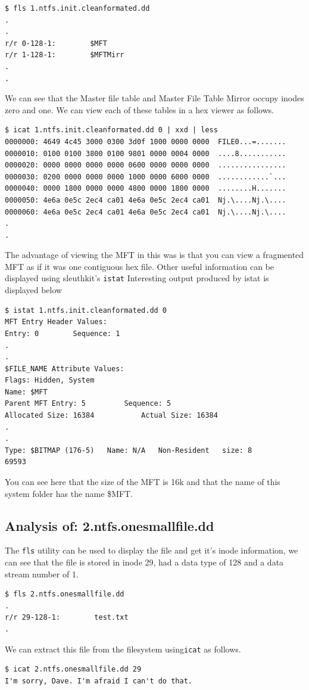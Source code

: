 \documentclass[a4paper,
    11pt,
    normalheadings,
    parindent,
    UKenglish,
    abstracton,
    ]{scrartcl}
\begin{document}
\begin{verbatim}
$ fls 1.ntfs.init.cleanformated.dd
.
.
r/r 0-128-1:        $MFT
r/r 1-128-1:        $MFTMirr
.
.
\end{verbatim}
We can see that the Master file table and Master File Table Mirror occupy inodes zero and one. We can view each of these tables in a hex viewer as follows.
\begin{verbatim}
$ icat 1.ntfs.init.cleanformated.dd 0 | xxd | less
0000000: 4649 4c45 3000 0300 3d0f 1000 0000 0000  FILE0...=.......
0000010: 0100 0100 3800 0100 9801 0000 0004 0000  ....8...........
0000020: 0000 0000 0000 0000 0600 0000 0000 0000  ................
0000030: 0200 0000 0000 0000 1000 0000 6000 0000  ............`...
0000040: 0000 1800 0000 0000 4800 0000 1800 0000  ........H.......
0000050: 4e6a 0e5c 2ec4 ca01 4e6a 0e5c 2ec4 ca01  Nj.\....Nj.\....
0000060: 4e6a 0e5c 2ec4 ca01 4e6a 0e5c 2ec4 ca01  Nj.\....Nj.\....
.
.
\end{verbatim}
The advantage of viewing the MFT in this was is that you can view a fragmented MFT as if it was one contiguous hex file. Other useful information can be displayed using sleuthkit's \texttt{istat}
Interesting output produced by istat is displayed below
\begin{verbatim}
$ istat 1.ntfs.init.cleanformated.dd 0
MFT Entry Header Values:
Entry: 0        Sequence: 1
.
.
$FILE_NAME Attribute Values:
Flags: Hidden, System
Name: $MFT
Parent MFT Entry: 5         Sequence: 5
Allocated Size: 16384           Actual Size: 16384
.
.
Type: $BITMAP (176-5)   Name: N/A   Non-Resident   size: 8
69593
\end{verbatim}
You can see here that the size of the MFT is 16k and that the name of this system folder has the name \$MFT.

\subsection{Analysis of: 2.ntfs.onesmallfile.dd}
The \texttt{fls} utility can be used to display the file and get it's inode information, we can see that the file is stored in inode 29, had a data type of 128 and a data stream number of 1.

\begin{verbatim}
$ fls 2.ntfs.onesmallfile.dd
.
r/r 29-128-1:        test.txt
.
\end{verbatim}
We can extract this file from the filesystem using\texttt{icat} as follows.
\begin{verbatim}
$ icat 2.ntfs.onesmallfile.dd 29
I'm sorry, Dave. I'm afraid I can't do that.
\end{verbatim}
\end{document}
